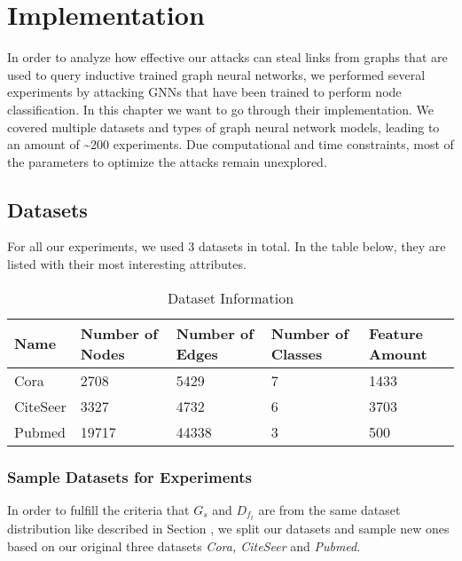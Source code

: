 \chapter{Implementation}

  In order to analyze how effective our attacks can steal links from graphs that are used to query inductive trained graph neural networks, we performed several experiments by attacking GNNs that have been trained to perform node classification.
  In this chapter we want to go through their implementation.
  We covered multiple datasets and types of graph neural network models, leading to an amount of \textasciitilde200 experiments.
  Due computational and time constraints, most of the parameters to optimize the attacks remain unexplored.

  \section{Datasets}

    For all our experiments, we used 3 datasets in total.
    In the table below, they are listed with their most interesting attributes.

    \vspace{0.48cm}
    \begin{table}[!h]
      \centering
      \footnotesize
      \begin{tabular}{l|l|l|l|l}
        \toprule
        Name & Number of Nodes & Number of Edges & Number of Classes & Feature Amount \\
        \midrule
        Cora & 2708            & 5429            & 7                 & 1433 \\
        CiteSeer & 3327        & 4732            & 6                 & 3703 \\
        Pubmed & 19717         & 44338           & 3                 & 500 \\
        \bottomrule
      \end{tabular}
      \caption{Dataset Information}
      \label{table:datasets}
    \end{table}

    \subsection*{Sample Datasets for Experiments}

      In order to fulfill the criteria that $G_s$ and $D_{f_t}$ are from the same dataset distribution like described in Section , we split our datasets and sample new ones based on our original three datasets \emph{Cora, CiteSeer} and \emph{Pubmed}.

